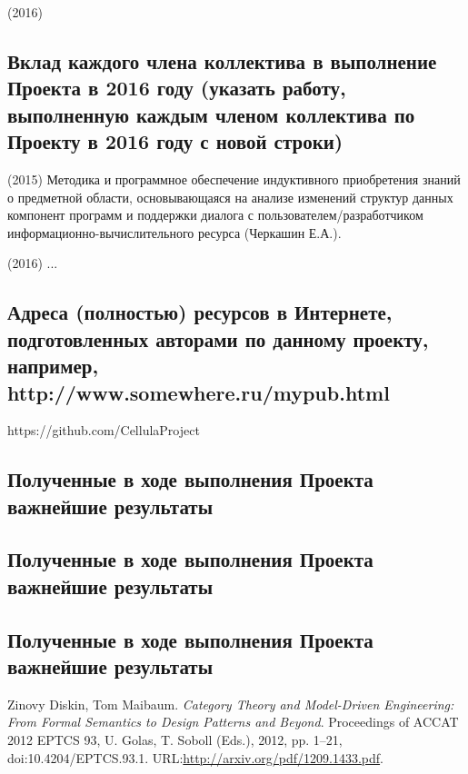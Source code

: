 \documentclass[12pt,a4paper]{ltxdoc}
\begin{document}
(2016)

\subsection{Вклад каждого члена коллектива в выполнение Проекта в 2016 году
  (указать работу, выполненную каждым членом коллектива по Проекту в 2016 году с
  новой строки)}
(2015) Методика и программное обеспечение индуктивного приобретения знаний о предметной области, основывающаяся на анализе изменений структур данных компонент программ и поддержки диалога с пользователем/разработчиком информационно-вычислительного ресурса (Черкашин Е.А.).

(2016) ...


\subsection{Адреса (полностью) ресурсов в Интернете, подготовленных авторами по
  данному проекту, например, http://www.somewhere.ru/mypub.html}

https://github.com/CellulaProject

\subsection{}
\subsection{Полученные в ходе выполнения Проекта важнейшие результаты}
\subsection{Полученные в ходе выполнения Проекта важнейшие результаты}
\subsection{Полученные в ходе выполнения Проекта важнейшие результаты}




\begin{thebibliography}{9}
 Zinovy Diskin, Tom Maibaum. \emph{Category Theory and
    Model-Driven Engineering: From Formal Semantics to Design Patterns and Beyond}. Proceedings of ACCAT 2012
EPTCS 93, U. Golas, T. Soboll (Eds.), 2012, pp. 1–21, doi:10.4204/EPTCS.93.1. URL:\url{http://arxiv.org/pdf/1209.1433.pdf}.
\end{thebibliography}

\end{document}
